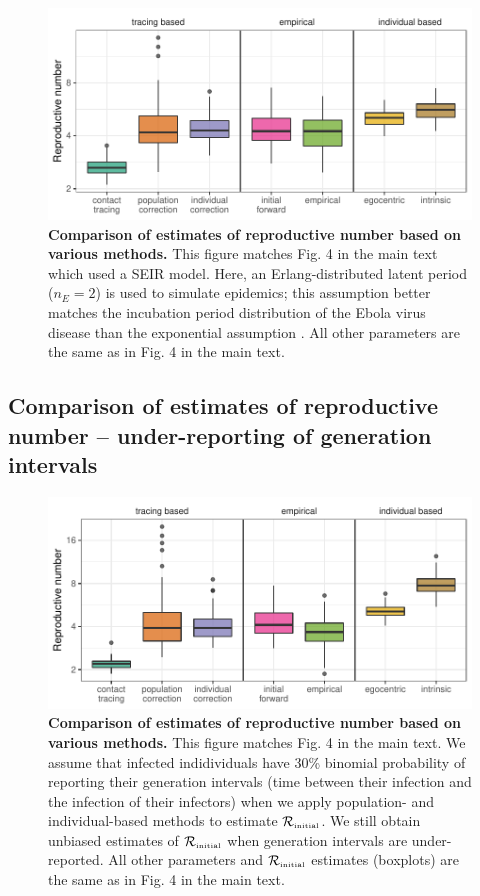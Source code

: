 \documentclass[12pt]{article}
\newcommand{\Rx}[1]{\ensuremath{{\mathcal R}_{#1}}\xspace}
\newcommand{\Rini}{\Rx{\textrm{\tiny initial}}}
\begin{document}
\begin{figure}[!h]
\includegraphics[width=\textwidth]{../fig/cmp_reproductive_seminr.pdf}
\caption{\textbf{Comparison of estimates of reproductive number based on various methods.}
This figure matches Fig. 4 in the main text which used a SEIR model.
Here, an Erlang-distributed latent period ($n_E=2$) is used to simulate epidemics; this assumption better matches the incubation period distribution of the Ebola virus disease than the exponential assumption \citep{who2014ebola}.
All other parameters are the same as in Fig. 4 in the main text.
}
\label{fig:cmpseminir}
\end{figure}

\pagebreak

\subsection{Comparison of estimates of reproductive number -- under-reporting of generation intervals}

\begin{figure}[!h]
\includegraphics[width=\textwidth]{../fig/cmp_reproductive_underreport.pdf}
\caption{\textbf{Comparison of estimates of reproductive number based on various methods.}
This figure matches Fig. 4 in the main text.
We assume that infected indidividuals have 30\% binomial probability of reporting their generation intervals (time between their infection and the infection of their infectors) when we apply population- and individual-based methods to estimate \Rini.
We still obtain unbiased estimates of \Rini when generation intervals are under-reported.
All other parameters and \Rini estimates (boxplots) are the same as in Fig. 4 in the main text.
}
\label{fig:cmpsmall}
\end{figure}
\end{document}
